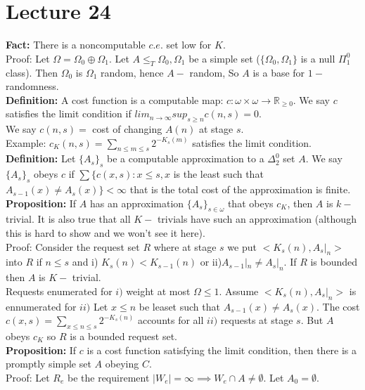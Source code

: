 \documentclass{article}
\newcommand{\bb}{\mathbb}
\begin{document}
  \section{Lecture 24}
  \textbf{Fact:} There is a noncomputable $c.e.$ set low for $K$.\\
  Proof: Let $\Omega = \Omega_0 \oplus \Omega_1$. Let $A \leq_T\Omega_0, \Omega_1$ be a simple set ($\{\Omega_0,\Omega_1\}$ is a null $\Pi^0_1$ class). Then $\Omega_0$ is $\Omega_1$ random, hence $A-$ random, So $A$ is a base for $1-$ randomness.\\
  \textbf{Definition:} A cost function is a computable map: $c: \omega \times \omega \to \bb R_{\geq 0}$. We say $c$ satisfies the limit condition if $lim_{n \to \infty} sup_{s\geq n} c(n,s) = 0$.\\
  We say $c(n,s) =$ cost of changing $A(n)$ at stage $s$.\\
  Example: $c_K(n,s) = \sum_{n \leq m \leq s} 2^{-K_s(m)}$ satisfies the limit condition.\\
  \textbf{Definition:} Let $\{A_s\}_s$ be a computable approximation to a $\Delta^0_2$ set $A$. We say $\{A_s\}_s$ obeys $c$ if $\sum \{c(x,s) : x\leq s, x$ is the least such that $A_{s-1}(x) \neq A_s(x)\} < \infty$ that is the total cost of the approximation is finite.\\
  \textbf{Proposition:} If $A$ has an approximation $\{A_s\}_{s\in \omega}$ that obeys $c_K$, then $A$ is $k-$ trivial. It is also true that all $K-$ trivials have such an approximation (although this is hard to show and we won't see it here).\\
  Proof: Consider the request set $R$ where at stage $s$ we put $<K_s(n),A_s|_n>$ into $R$ if $n \leq s$ and i) $K_s(n) < K_{s-1}(n)$ or ii)$A_{s-1}|_n \neq A_s|_n$. If $R$ is bounded then $A$ is $K-$ trivial.\\
  Requests enumerated for $i)$ weight at most $\Omega \leq 1$. Assume $<K_s(n) , A_s|_n> $ is ennumerated for $ii)$ Let $x \leq n$ be leaset such that $A_{s-1}(x) \neq A_s(x)$. The cost $c(x,s) = \sum_{x\leq n\leq s} 2^{-K_s(n)}$ accounts for all $ii)$ requests at stage $s$. But $A$ obeys $c_K$ so $R$ is a bounded request set.\\
  \textbf{Proposition:} If $c$ is a cost function satisfying the limit condition, then there is a promptly simple set $A$ obeying $C$.\\
  Proof: Let $R_e$ be the requirement  $|W_e| = \infty \implies W_e \cap A \neq \emptyset$. Let $A_0 = \emptyset $.\\
\end{document}
